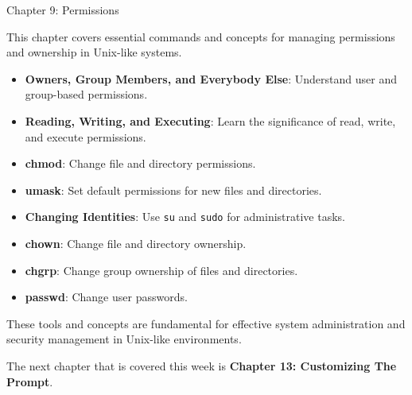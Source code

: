 \begin{notes}{Chapter 9: Permissions}
\begin{highlight}
    \end{highlight}
    
    \begin{highlight}
    
    This chapter covers essential commands and concepts for managing permissions and ownership in Unix-like systems.
    
    \begin{itemize}
        \item \textbf{Owners, Group Members, and Everybody Else}: Understand user and group-based permissions.
        \item \textbf{Reading, Writing, and Executing}: Learn the significance of read, write, and execute permissions.
        \item \textbf{chmod}: Change file and directory permissions.
        \item \textbf{umask}: Set default permissions for new files and directories.
        \item \textbf{Changing Identities}: Use \texttt{su} and \texttt{sudo} for administrative tasks.
        \item \textbf{chown}: Change file and directory ownership.
        \item \textbf{chgrp}: Change group ownership of files and directories.
        \item \textbf{passwd}: Change user passwords.
    \end{itemize}
    
    These tools and concepts are fundamental for effective system administration and security management in Unix-like environments.
    
    \end{highlight}
\end{notes}

The next chapter that is covered this week is \textbf{Chapter 13: Customizing The Prompt}.

